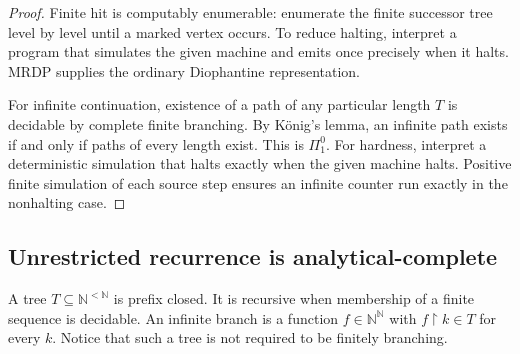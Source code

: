\documentclass[11pt,letterpaper]{article}
\theoremstyle{definition}
\theoremstyle{remark}
\newcommand{\N}{\mathbb N}
\newcommand{\1}{\mathbf 1}
\newcommand{\srctag}[1]{\texorpdfstring{\hspace{0.4em}{\normalfont\small\color{accent}[source #1]}}{ [source #1]}}
\begin{document}
\begin{proof}
Finite hit is computably enumerable: enumerate the finite successor tree
level by level until a marked vertex occurs. To reduce halting, interpret a
program that simulates the given machine and emits once precisely when it
halts. MRDP supplies the ordinary Diophantine representation.

For infinite continuation, existence of a path of any particular length
$T$ is decidable by complete finite branching. By K\"onig's lemma, an
infinite path exists if and only if paths of every length exist. This is
$\Pi^0_1$. For hardness, interpret a deterministic simulation that halts
exactly when the given machine halts. Positive finite simulation of each
source step ensures an infinite counter run exactly in the nonhalting case.
\end{proof}
\subsection{Unrestricted recurrence is analytical-complete\srctag{03}}\label{lbh:qd:sec:analytic}

A tree $T\subseteq\N^{<\N}$ is prefix closed. It is recursive when membership
of a finite sequence is decidable. An infinite branch is a function
$f\in\N^\N$ with $f\upharpoonright k\in T$ for every $k$. Notice that
such a tree is not required to be finitely branching.
\end{document}
